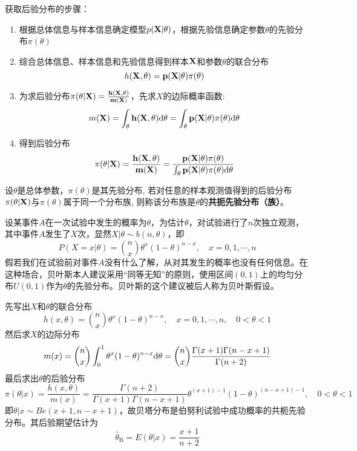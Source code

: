 获取后验分布的步骤：
\begin{enumerate}
    \item 根据总体信息与样本信息确定模型$p(\bf{X} | \theta)$，根据先验信息确定参数$\theta$的先验分布$\pi(\theta)$
    \item 综合总体信息、样本信息和先验信息得到样本$\bf{X}$和参数$\theta$的联合分布
          \[h(\bf{X}, \theta)=p(\bf{X}|\theta) \pi(\theta)\]
    \item 为求后验分布$\pi(\theta|\bf{X})=\frac{h(\bf{X}, \theta)}{m(\bf{X})}$，先求$X$的边际概率函数:
          \[ m(\bf{X})=\int_{\bf{\theta}} h(\bf{X}, \theta) \mathrm{d} \theta=\int_{\bf{\theta}} p(\bf{X}| \theta) \pi(\theta) \mathrm{d} \theta \]
    \item 得到后验分布
          \[ \pi(\theta | \bf{X})=\frac{h(\bf{X}, \theta)}{m(\bf{X})}=\frac{p(\bf{X} | \theta) \pi(\theta)}{\int_{\bf{\theta}} p(\bf{X} | \theta) \pi(\theta) \mathrm{d} \theta} \]
\end{enumerate}

\begin{definition}[共扼先验分布]
    设$\theta$是总体参数，$\pi(\theta)$是其先验分布, 若对任意的样本观测值得到的后验分布$\pi(\theta|\bf{X})$与$\pi(\theta)$属于同一个分布族, 则称该分布族是$\theta$的\textbf{共扼先验分布（族）}。
\end{definition}

\begin{example}
    设某事件$A$在一次试验中发生的概率为$\theta$，为估计$\theta$，对试验进行了$n$次独立观测，其中事件$A$发生了$X$次，显然$X | \theta \sim b(n, \theta)$，即
    \[P(X=x | \theta)=\binom{n}{x} \theta^{x}(1-\theta)^{n-x}, \quad x=0,1, \cdots, n\]
    假若我们在试验前对事件$A$没有什么了解，从对其发生的概率也没有任何信息。在这种场合，贝叶斯本人建议采用“同等无知”的原则，使用区间$(0,1)$上的均匀分布$U(0,1)$作为$\theta$的先验分布。贝叶斯的这个建议被后人称为贝叶斯假设。
\end{example}
\begin{solution}
    先写出$X$和$\theta$的联合分布
    \[ h(x, \theta)=\binom{n}{x} \theta^x (1-\theta)^{n-x}, \quad x=0,1, \cdots, n, \quad 0<\theta<1\]
    然后求$X$的边际分布
    \[ m(x)=\binom{n}{x} \int_0^1 \theta^x (1-\theta)^{n - x} \mathrm{d} \theta=\binom{n}{x} \frac{\Gamma(x+1) \Gamma(n-x+1)}{\Gamma(n+2)}\]
    最后求出$\theta$的后验分布
    \[ \pi(\theta | x) =\frac{h(x, \theta)}{m(x)} =\frac{\Gamma(n+2)}{\Gamma(x+1) \Gamma(n-x+1)} \theta^{(x+1)-1}(1-\theta)^{(n-x+1)-1}, \quad 0<\theta<1  \]
    即$\theta | x \sim B e(x+1, n-x+1)$，故贝塔分布是伯努利试验中成功概率的共枙先验分布。其后验期望估计为
    \[ \hat{\theta}_{\mathrm{B}}=E(\theta | x)=\frac{x+1}{n+2} \]
\end{solution}

